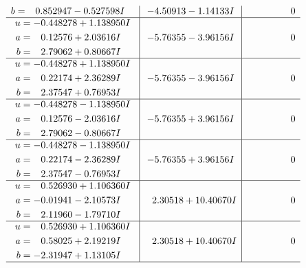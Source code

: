 \documentclass[1p]{elsarticle_modified}
\theoremstyle{definition}
\begin{document}
$$\begin{array}{c|c|c}
\begin{aligned}
b &= \phantom{-}0.852947 - 0.527598 I\end{aligned}
 & -4.50913 - 1.14133 I & \phantom{-0.000000 } 0 \\ \hline\begin{aligned}
u &= -0.448278 + 1.138950 I \\
a &= \phantom{-}0.12576 + 2.03616 I \\
b &= \phantom{-}2.79062 + 0.80667 I\end{aligned}
 & -5.76355 - 3.96156 I & \phantom{-0.000000 } 0 \\ \hline\begin{aligned}
u &= -0.448278 + 1.138950 I \\
a &= \phantom{-}0.22174 + 2.36289 I \\
b &= \phantom{-}2.37547 + 0.76953 I\end{aligned}
 & -5.76355 - 3.96156 I & \phantom{-0.000000 } 0 \\ \hline\begin{aligned}
u &= -0.448278 - 1.138950 I \\
a &= \phantom{-}0.12576 - 2.03616 I \\
b &= \phantom{-}2.79062 - 0.80667 I\end{aligned}
 & -5.76355 + 3.96156 I & \phantom{-0.000000 } 0 \\ \hline\begin{aligned}
u &= -0.448278 - 1.138950 I \\
a &= \phantom{-}0.22174 - 2.36289 I \\
b &= \phantom{-}2.37547 - 0.76953 I\end{aligned}
 & -5.76355 + 3.96156 I & \phantom{-0.000000 } 0 \\ \hline\begin{aligned}
u &= \phantom{-}0.526930 + 1.106360 I \\
a &= -0.01941 - 2.10573 I \\
b &= \phantom{-}2.11960 - 1.79710 I\end{aligned}
 & \phantom{-}2.30518 + 10.40670 I & \phantom{-0.000000 } 0 \\ \hline\begin{aligned}
u &= \phantom{-}0.526930 + 1.106360 I \\
a &= \phantom{-}0.58025 + 2.19219 I \\
b &= -2.31947 + 1.13105 I\end{aligned}
 & \phantom{-}2.30518 + 10.40670 I & \phantom{-0.000000 } 0\\
 \hline 
 \end{array}$$\newpage$$\begin{array}{c|c|c}  

\end{array}$$
\end{document}
